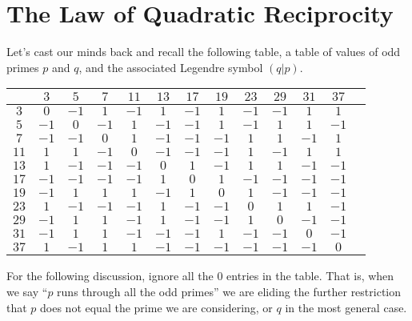 \documentclass[a4paper]{article}
\newcommand{\ileg}[2]{(#1|#2)}
\begin{document}
\section*{The Law of Quadratic Reciprocity}
Let's cast our minds back and recall the following table, a table
of values of odd primes \(p\) and \(q\), and the associated
Legendre symbol \(\ileg{q}{p}\).
\begin{center}
	\begin{tabular}{|c||c|c|c|c|c|c|c|c|c|c|c|c|}
		\hline
		\diagbox{\(p\)}{\(q\)}& \(3\)&\(5\)&\(7\)&\(11\)&\(13\)&\(17\)&\(19\)&\(23\)&\(29\)&\(31\)&\(37\)\\
		\hline\hline
		\(3\)& \(0\)&	\(-1\)&	\(1\)&	\(-1\)&	\(1\)&	\(-1\)&	\(1\)&	\(-1\)&	\(-1\)&	\(1\)&	\(1\)\\ \hline
		\(5\)&\(-1\)&	\(0\)&	\(-1\)&	\(1\)&	\(-1\)&	\(-1\)&	\(1\)&	\(-1\)&	\(1\)&	\(1\)&	\(-1\)\\ \hline
		\(7\)&\(-1\)&	\(-1\)&	\(0\)&	\(1\)&	\(-1\)&	\(-1\)&	\(-1\)&	\(1\)&	\(1\)&	\(-1\)&	\(1\)\\ \hline
		\(11\)&\(1\)&	\(1\)&	\(-1\)&	\(0\)&	\(-1\)&	\(-1\)&	\(-1\)&	\(1\)&	\(-1\)&	\(1\)&	\(1\)\\ \hline
		\(13\)&\(1\)&	\(-1\)&	\(-1\)&	\(-1\)&	\(0\)&	\(1\)&	\(-1\)&	\(1\)&	\(1\)&	\(-1\)&	\(-1\)\\ \hline
		\(17\)&\(-1\)&	\(-1\)&	\(-1\)&	\(-1\)&	\(1\)&	\(0\)&	\(1\)&	\(-1\)&	\(-1\)&	\(-1\)&	\(-1\)\\ \hline
		\(19\)&\(-1\)&	\(1\)&	\(1\)&	\(1\)&	\(-1\)&	\(1\)&	\(0\)&	\(1\)&	\(-1\)&	\(-1\)&	\(-1\)\\ \hline
		\(23\)&\(1\)&	\(-1\)&	\(-1\)&	\(-1\)&	\(1\)&	\(-1\)&	\(-1\)&	\(0\)&	\(1\)&	\(1\)&	\(-1\)\\ \hline
		\(29\)&\(-1\)&	\(1\)&	\(1\)&	\(-1\)&	\(1\)&	\(-1\)&	\(-1\)&	\(1\)&	\(0\)&	\(-1\)&	\(-1\)\\ \hline
		\(31\)&\(-1\)&	\(1\)&	\(1\)&	\(-1\)&	\(-1\)&	\(-1\)&	\(1\)&	\(-1\)&	\(-1\)&	\(0\)&	\(-1\)\\ \hline
		\(37\)&\(1\)&	\(-1\)&	\(1\)&	\(1\)&	\(-1\)&	\(-1\)&	\(-1\)&	\(-1\)&	\(-1\)&	\(-1\)&	\(0\)\\ \hline
	\end{tabular}
\end{center}
For the following discussion, ignore all the \(0\) entries in the table.
That is, when we say ``\(p\) runs through all the odd primes'' we are
eliding the further restriction that \(p\) does not equal the prime
we are considering, or \(q\) in the most general case.
\end{document}
